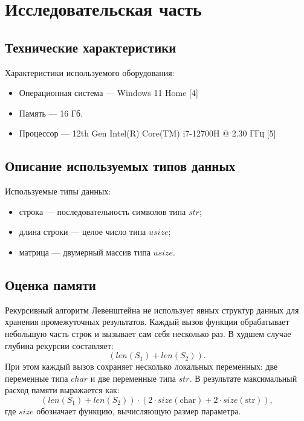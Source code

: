 \chapter{Исследовательская часть}

\section{Технические характеристики}
Характеристики используемого оборудования:
\begin{itemize}
    \item Операционная система --- Windows 11 Home [4]
    \item Память --- 16 Гб.
    \item Процессор --- 12th Gen Intel(R) Core(TM) i7-12700H @  2.30 ГГц [5]
\end{itemize}

\section{Описание используемых типов данных}
Используемые типы данных:
\begin{itemize}
	\item строка --- последовательность символов типа $str$;
	\item длина строки --- целое число типа $usize$;
	\item матрица --- двумерный массив типа $usize$.
\end{itemize}

\section{Оценка памяти}

Рекурсивный алгоритм Левенштейна не использует явных структур данных для хранения промежуточных результатов. Каждый вызов функции обрабатывает небольшую часть строк и вызывает сам себя несколько раз. В худшем случае глубина рекурсии составляет:
\begin{equation}
	(len(S_{1}) + len(S_{2})).
\end{equation}
При этом каждый вызов сохраняет несколько локальных переменных: две переменные типа $char$ и две переменные типа $str$. В результате максимальный расход памяти выражается как:
\begin{equation}
    (len(S_{1}) + len(S_{2})) \cdot (2 \cdot size(\text{char}) + 2 \cdot size(\text{str})),
\end{equation}
где $size$ обозначает функцию, вычисляющую размер параметра.


